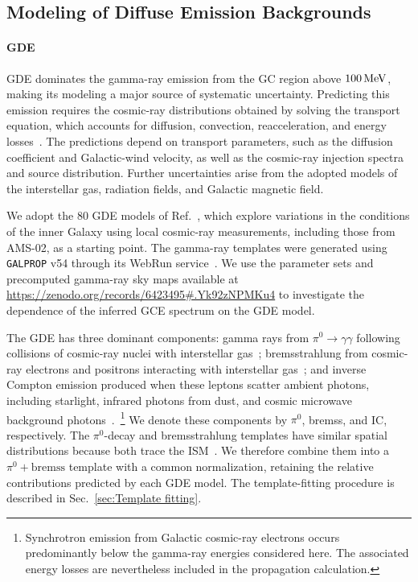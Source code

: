 \documentclass[superscriptaddress,
showpacs,preprintnumbers,nofootinbib,eqsecnum,amsmath,amssymb,aps,11pt, groupedaddress, floatfix]{revtex4-2}
\begin{document}
\subsection{Modeling of Diffuse Emission Backgrounds}


\paragraph{GDE}
GDE dominates the gamma-ray emission from the GC region above $100\,{\rm MeV}$, making its modeling a major source of systematic uncertainty. 
Predicting this emission requires the cosmic-ray distributions obtained by solving the transport equation, which accounts for diffusion, convection, reacceleration, and energy losses~\cite{Strong:2007nh}. 
The predictions depend on transport parameters, such as the diffusion coefficient and Galactic-wind velocity, as well as the cosmic-ray injection spectra and source distribution. 
Further uncertainties arise from the adopted models of the interstellar gas, radiation fields, and Galactic magnetic field.

We adopt the 80 GDE models of Ref.~\cite{Cholis:2021rpp}, which explore variations in the conditions of the inner Galaxy using local cosmic-ray measurements, including those from AMS-02, as a starting point. 
The gamma-ray templates were generated using \texttt{GALPROP} v54 through its WebRun service~\cite{Strong:1998fr, Strong:2007nh, Vladimirov:2010aq}. 
We use the parameter sets and precomputed gamma-ray sky maps available at \url{https://zenodo.org/records/6423495#.Yk92zNPMKu4} to investigate the dependence of the inferred GCE spectrum on the GDE model.

The GDE has three dominant components: gamma rays from $\pi^0\rightarrow\gamma\gamma$ following collisions of cosmic-ray nuclei with interstellar gas~\cite{Kamae:2006bf}; bremsstrahlung from cosmic-ray electrons and positrons interacting with interstellar gas~\cite{Koch:1959zz, Blumenthal:1970gc}; and inverse Compton emission produced when these leptons scatter ambient photons, including starlight, infrared photons from dust, and cosmic microwave background photons~\cite{Blumenthal:1970gc, Jones:1968zza}.~\footnote{Synchrotron emission from Galactic cosmic-ray electrons occurs predominantly below the gamma-ray energies considered here. The associated energy losses are nevertheless included in the propagation calculation.}
We denote these components by $\pi^0$, bremss, and IC, respectively. 
The $\pi^0$-decay and bremsstrahlung templates have similar spatial distributions because both trace the ISM~\cite{Calore:2014xka, Cholis:2021rpp}. 
We therefore combine them into a $\pi^0+\mathrm{bremss}$ template with a common normalization, retaining the relative contributions predicted by each GDE model. 
The template-fitting procedure is described in Sec.~\ref{sec:Template fitting}.
\end{document}
